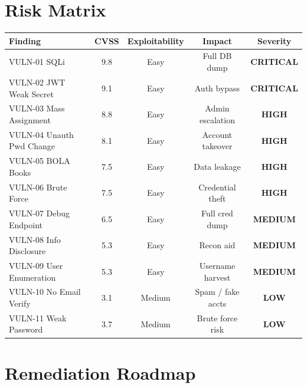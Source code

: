 \documentclass[11pt,a4paper]{article}
\newcommand{\critical}[1]{\colorbox{critred}{\color{white}\textbf{\footnotesize #1}}}
\newcommand{\high}[1]   {\colorbox{highorg}{\color{white}\textbf{\footnotesize #1}}}
\newcommand{\medium}[1] {\colorbox{medyel} {\color{white}\textbf{\footnotesize #1}}}
\newcommand{\low}[1]    {\colorbox{lowblue}{\color{white}\textbf{\footnotesize #1}}}
\begin{document}
\newpage
\section{Risk Matrix}

\begin{center}
\begin{tabular}{lcccc}
  \toprule
  \textbf{Finding} & \textbf{CVSS} & \textbf{Exploitability} & \textbf{Impact} & \textbf{Severity} \\
  \midrule
  VULN-01 SQLi              & 9.8 & Easy   & Full DB dump       & \critical{CRITICAL} \\
  VULN-02 JWT Weak Secret   & 9.1 & Easy   & Auth bypass        & \critical{CRITICAL} \\
  VULN-03 Mass Assignment   & 8.8 & Easy   & Admin escalation   & \high{HIGH} \\
  VULN-04 Unauth Pwd Change & 8.1 & Easy   & Account takeover   & \high{HIGH} \\
  VULN-05 BOLA Books        & 7.5 & Easy   & Data leakage       & \high{HIGH} \\
  VULN-06 Brute Force       & 7.5 & Easy   & Credential theft   & \high{HIGH} \\
  VULN-07 Debug Endpoint    & 6.5 & Easy   & Full cred dump     & \medium{MEDIUM} \\
  VULN-08 Info Disclosure   & 5.3 & Easy   & Recon aid          & \medium{MEDIUM} \\
  VULN-09 User Enumeration  & 5.3 & Easy   & Username harvest   & \medium{MEDIUM} \\
  VULN-10 No Email Verify   & 3.1 & Medium & Spam / fake accts  & \low{LOW} \\
  VULN-11 Weak Password     & 3.7 & Medium & Brute force risk   & \low{LOW} \\
  \bottomrule
\end{tabular}
\end{center}

\section{Remediation Roadmap}
\end{document}

